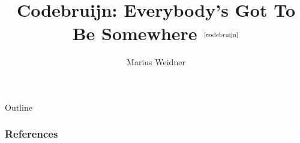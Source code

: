 \documentclass[aspectratio=169]{beamer}
\title{Codebruijn: Everybody's Got To Be Somewhere
  $^{\text{\cite{codebruijn}}}$}
\institute[Uni Freiburg]{Chair of Programming Languages, University of
  Freiburg}
\author{Marius Weidner}
\begin{document}
\begin{frame}
  \titlepage{}
\end{frame}

\begin{frame}{Outline}
  \tableofcontents
\end{frame}

\begin{frame}[fragile]
  \frametitle{References}
  \printbibliography{}
\end{frame}
\end{document}
